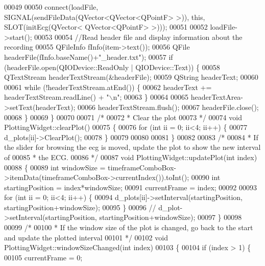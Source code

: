 \begin{DoxyCode}
00049 
00050     connect(loadFile, SIGNAL(sendFileData(QVector<QVector<QPointF> >)), \textcolor{keyword}{this}, SLOT(initEcg(QVector<
      QVector<QPointF> >)));
00051 
00052     loadFile->start();
00053 
00054     \textcolor{comment}{//Read header file and display information about the recording}
00055     QFileInfo fInfo(item->text());
00056     QFile headerFile(fInfo.baseName()+\textcolor{stringliteral}{"\_header.txt"});
00057     \textcolor{keywordflow}{if} (headerFile.open(QIODevice::ReadOnly | QIODevice::Text)) \{
00058         QTextStream headerTextStream(&headerFile);
00059         QString headerText;
00060 
00061         \textcolor{keywordflow}{while} (!headerTextStream.atEnd()) \{
00062             headerText += headerTextStream.readLine() + \textcolor{stringliteral}{"\(\backslash\)n"};
00063         \}
00064 
00065         headerTextArea->setText(headerText);
00066         headerTextStream.flush();
00067         headerFile.close();
00068     \}
00069 \}
00070 
00071 \textcolor{comment}{/*}
00072 \textcolor{comment}{ * Clear the plot}
00073 \textcolor{comment}{ */}
00074 \textcolor{keywordtype}{void} PlottingWidget::clearPlot()
00075 \{
00076     \textcolor{keywordflow}{for} (\textcolor{keywordtype}{int} ii = 0; ii<4; ii++) \{
00077         d\_plots[ii]->ClearPlot();
00078     \}
00079 
00080 
00081 \}
00082 
00083 \textcolor{comment}{/*}
00084 \textcolor{comment}{ * If the slider for browsing the ecg is moved, update the plot to show the new interval of}
00085 \textcolor{comment}{ * the ECG.}
00086 \textcolor{comment}{ */}
00087 \textcolor{keywordtype}{void} PlottingWidget::updatePlot(\textcolor{keywordtype}{int} index)
00088 \{
00089     \textcolor{keywordtype}{int} windowSize = timeframeComboBox->itemData(timeframeComboBox->currentIndex()).toInt();
00090     \textcolor{keywordtype}{int} startingPosition = index*windowSize;
00091     currentFrame = index;
00092 
00093     \textcolor{keywordflow}{for} (\textcolor{keywordtype}{int} ii = 0; ii<4; ii++) \{
00094         d\_plots[ii]->setInterval(startingPosition, startingPosition+windowSize);
00095     \}
00096     \textcolor{comment}{// d\_plot->setInterval(startingPosition, startingPosition+windowSize);}
00097 \}
00098 
00099 \textcolor{comment}{/*}
00100 \textcolor{comment}{ * If the window size of the plot is changed, go back to the start and update the plotted interval}
00101 \textcolor{comment}{ */}
00102 \textcolor{keywordtype}{void} PlottingWidget::windowSizeChanged(\textcolor{keywordtype}{int} index)
00103 \{
00104     \textcolor{keywordflow}{if} (index > 1) \{
00105         currentFrame = 0;

\end{DoxyCode}
